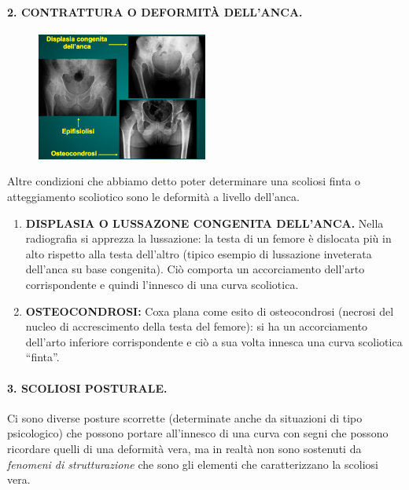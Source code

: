 \paragraph{2. CONTRATTURA O DEFORMITÀ DELL'ANCA. }


\begin{figure}[!ht]
\centering
	\includegraphics[width=0.5\textwidth]{012/image2.png}
\end{figure}

Altre condizioni che abbiamo detto poter determinare una scoliosi finta o
atteggiamento scoliotico sono le deformità a livello dell'anca.

\begin{enumerate}
\def\labelenumi{\arabic{enumi}.}
\item
  \textbf{DISPLASIA O LUSSAZONE CONGENITA DELL'ANCA.} Nella radiografia
  si apprezza la lussazione: la testa di un femore è dislocata più in
  alto rispetto alla testa dell'altro (tipico esempio di lussazione
  inveterata dell'anca su base congenita). Ciò comporta un accorciamento
  dell'arto corrispondente e quindi l'innesco di una curva scoliotica.
\item
  \textbf{OSTEOCONDROSI:} Coxa plana come esito di osteocondrosi
  (necrosi del nucleo di accrescimento della testa del femore): si ha un
  accorciamento dell'arto inferiore corrispondente e ciò a sua volta
  innesca una curva scoliotica ``finta''.
\end{enumerate}

\paragraph{3. SCOLIOSI POSTURALE.}


Ci sono diverse posture scorrette (determinate anche da situazioni di
tipo psicologico) che possono portare all'innesco di una curva con segni
che possono ricordare quelli di una deformità vera, ma in realtà non
sono sostenuti da \emph{fenomeni di strutturazione} che sono gli
elementi che caratterizzano la scoliosi vera.

